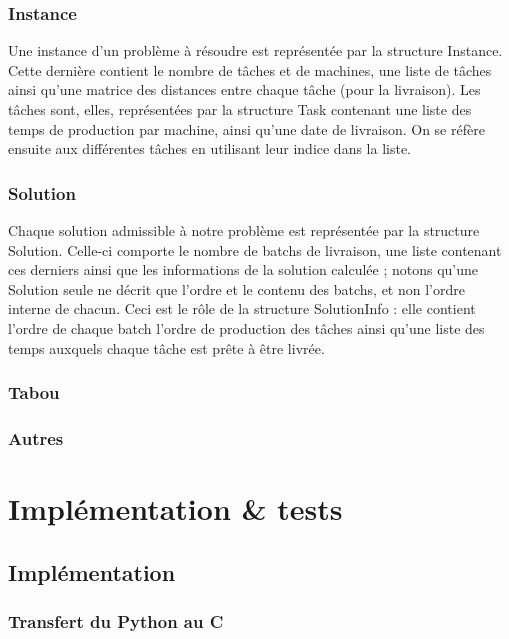 \documentclass[hideweeklyreports]{polytech/polytech}
\begin{document}
			\subsection{Instance}
				Une instance d'un problème à résoudre est représentée par la structure Instance. Cette dernière contient le nombre de tâches et de machines, une liste de tâches ainsi qu'une matrice des distances entre chaque tâche (pour la livraison). Les tâches sont, elles, représentées par la structure Task contenant une liste des temps de production par machine, ainsi qu'une date de livraison. On se réfère ensuite aux différentes tâches en utilisant leur indice dans la liste.
				
			\subsection{Solution}
				Chaque solution admissible à notre problème est représentée par la structure Solution. Celle-ci comporte le nombre de batchs de livraison, une liste contenant ces derniers ainsi que les informations de la solution calculée ; notons qu'une Solution seule ne décrit que l'ordre et le contenu des batchs, et non l'ordre interne de chacun. Ceci est le rôle de la structure SolutionInfo : elle contient l'ordre de chaque batch l'ordre de production des tâches ainsi qu'une liste des temps auxquels chaque tâche est prête à être livrée.
				
			\subsection{Tabou} %

			\subsection{Autres} %

		
	\chapter{Implémentation \& tests} %
		\section{Implémentation} %
			\subsection{Transfert du Python au C} %
			\label{methR}
\end{document}
